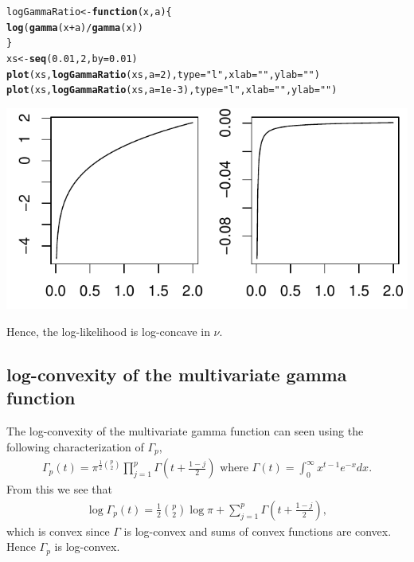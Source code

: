 \documentclass{article}\usepackage[]{graphicx}\usepackage[]{color}
\makeatletter
\def\maxwidth{ %
  \ifdim\Gin@nat@width>\linewidth
    \linewidth
  \else
    \Gin@nat@width
  \fi
}
\newcommand{\hlnum}[1]{\textcolor[rgb]{0.686,0.059,0.569}{#1}}%
\newcommand{\hlstr}[1]{\textcolor[rgb]{0.192,0.494,0.8}{#1}}%
\newcommand{\hlopt}[1]{\textcolor[rgb]{0,0,0}{#1}}%
\newcommand{\hlstd}[1]{\textcolor[rgb]{0.345,0.345,0.345}{#1}}%
\newcommand{\hlkwa}[1]{\textcolor[rgb]{0.161,0.373,0.58}{\textbf{#1}}}%
\newcommand{\hlkwb}[1]{\textcolor[rgb]{0.69,0.353,0.396}{#1}}%
\newcommand{\hlkwc}[1]{\textcolor[rgb]{0.333,0.667,0.333}{#1}}%
\newcommand{\hlkwd}[1]{\textcolor[rgb]{0.737,0.353,0.396}{\textbf{#1}}}%
\newenvironment{kframe}{%
 \def\at@end@of@kframe{}%
 \ifinner\ifhmode%
  \def\at@end@of@kframe{\end{minipage}}%
  \begin{minipage}{\columnwidth}%
 \fi\fi%
 \def\FrameCommand##1{\hskip\@totalleftmargin \hskip-\fboxsep
 \colorbox{shadecolor}{##1}\hskip-\fboxsep
     \hskip-\linewidth \hskip-\@totalleftmargin \hskip\columnwidth}%
 \MakeFramed {\advance\hsize-\width
   \@totalleftmargin\z@ \linewidth\hsize
   \@setminipage}}%
 {\par\unskip\endMakeFramed%
 \at@end@of@kframe}
\newenvironment{knitrout}{}{} %
\makeatother
\begin{document}
\begin{knitrout}\footnotesize
{}\color{fgcolor}\begin{kframe}
\begin{alltt}
\hlstd{logGammaRatio} \hlkwb{<-} \hlkwa{function}\hlstd{(}\hlkwc{x}\hlstd{,} \hlkwc{a}\hlstd{) \{}
  \hlkwd{log}\hlstd{(}\hlkwd{gamma}\hlstd{(x} \hlopt{+} \hlstd{a)}\hlopt{/}\hlkwd{gamma}\hlstd{(x))}
\hlstd{\}}
\hlstd{xs} \hlkwb{<-} \hlkwd{seq}\hlstd{(}\hlnum{0.01}\hlstd{,} \hlnum{2}\hlstd{,} \hlkwc{by} \hlstd{=} \hlnum{0.01}\hlstd{)}
\hlkwd{plot}\hlstd{(xs,} \hlkwd{logGammaRatio}\hlstd{(xs,} \hlkwc{a} \hlstd{=} \hlnum{2}\hlstd{),}    \hlkwc{type} \hlstd{=} \hlstr{"l"}\hlstd{,} \hlkwc{xlab} \hlstd{=} \hlstr{""}\hlstd{,} \hlkwc{ylab} \hlstd{=} \hlstr{""}\hlstd{)}
\hlkwd{plot}\hlstd{(xs,} \hlkwd{logGammaRatio}\hlstd{(xs,} \hlkwc{a} \hlstd{=} \hlnum{1e-3}\hlstd{),} \hlkwc{type} \hlstd{=} \hlstr{"l"}\hlstd{,} \hlkwc{xlab} \hlstd{=} \hlstr{""}\hlstd{,} \hlkwc{ylab} \hlstd{=} \hlstr{""}\hlstd{)}
\end{alltt}
\end{kframe}
\includegraphics[width=\maxwidth]{figure/log_gamma_ratio} 

\end{knitrout}
Hence, the log-likelihood is log-concave in $\nu$.

\subsection{log-convexity of the multivariate gamma function}
\label{sec:multigamma}
The log-convexity of the multivariate gamma function can seen using the following characterization of $\Gamma_p$,
\begin{align}
  \label{eq:multigamma}
  \Gamma_p(t) = \pi^{ \frac{1}{2} \binom{p}{2} }
  \prod_{j = 1}^p \Gamma\!\left(t + \frac{1 - j}{2}\right)
  \text{ where }
  \Gamma(t) = \int_0^\infty x^{t-1} e^{-x} dx.
\end{align}
From this we see that
\begin{align}
  \label{eq:logmultigamma}
  \log\Gamma_p(t) =
  \frac{1}{2}\binom{p}{2} \log\pi +
  \sum_{j = 1}^p \Gamma\left(t + \frac{1-j}{2}\right),
\end{align}
which is convex since $\Gamma$ is log-convex and sums of convex functions are convex.
Hence $\Gamma_p$ is log-convex.
\end{document}
